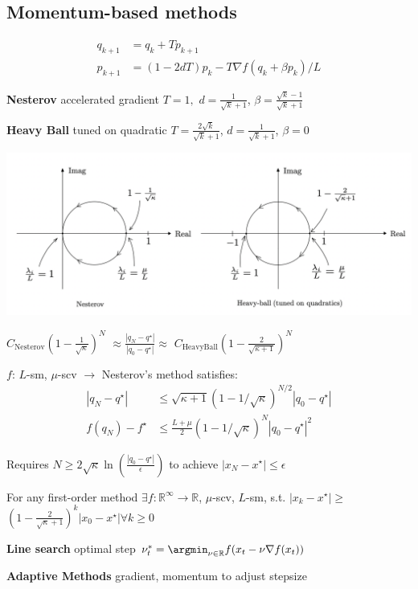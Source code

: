 \subsection{Momentum-based methods}

\[\begin{aligned}
		q_{k+1} & = q_k + Tp_{k+1}                          \\
		p_{k+1} & = (1-2dT)p_k-T\nabla f(q_k + \beta p_k)/L
	\end{aligned}\]

\textbf{Nesterov}
accelerated gradient
$T = 1,$
$d=\frac{1}{\sqrt{k}+1}$,
$\beta =\frac{\sqrt{k}-1}{\sqrt{k}+1}$

\textbf{Heavy Ball}
tuned on quadratic
$T = \frac{2\sqrt{k}}{\sqrt{k}+1}$,
$d=\frac{1}{\sqrt{k}+1}$,
$\beta=0$

\includegraphics[width=\columnwidth]{images/root-locus-momentum.png}

\begin{centering}
	$C_\text{Nesterov}(1-\frac{1}{\sqrt{\kappa}})^N$
	$\approx\frac{|q_N-q^\star|}{|q_0-q^\star|}\approx$
	$C_\text{HeavyBall}(1-\frac{2}{\sqrt{\kappa+1}})^N$
\end{centering}

\begin{theorem}
	$f$: $L$-sm, $\mu$-scv
	$\rightarrow$
	Nesterov's method satisfies:
	\[  \begin{aligned}
			|q_N-q^\star|  & \le
			\sqrt{\kappa+1}(1-1/\sqrt{\kappa})^{N/2}|q_0-q^\star|
			\\
			f(q_N)-f^\star & \le
			\frac{L+\mu}{2}(1-1/\sqrt{\kappa})^{N}|q_0-q^\star|^2
		\end{aligned}\]
\end{theorem}


Requires
$N\ge2\sqrt{\kappa}\operatorname{ln}(\frac{|q_{0}-q^\star|}{\epsilon})$
to achieve
$|x_{N}-x^\star|\le\epsilon$

\begin{theorem}
	For any first-order method
	$\exists f: \mathbb{R}^{\infty}\rightarrow\mathbb{R}$,
	$\mu$-scv, $L$-sm,
	s.t.
	$|x_k - x^\star|\ge$
	$(1-\frac{2}{\sqrt{\kappa}+1})^k|x_0 - x^\star| \forall k\ge 0$

\end{theorem}

\textbf{Line search}
optimal step
$\nu_t^*=\argmin_{\nu\in\mathbb{R}}f(x_t-\nu\nabla f(x_t))$

\textbf{Adaptive Methods}
gradient, momentum to adjust stepsize
